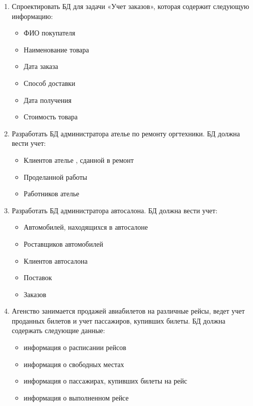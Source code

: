 \documentclass[a4paper]{article}
\begin{document}
\begin{enumerate}
   БД для задачи «Учет выполненных работ», которая содержит следующую информацию :
    \begin{itemize}
        \item ФИО работника
        \item Должность
        \item Наименование работы
        \item Срок выполнения
        \item Дата получения
        \item Отметка о выполнении
    \end{itemize}

  \item Спроектировать БД для задачи «Учет заказов», которая содержит следующую информацию:
    \begin{itemize}
        \item ФИО покупателя
        \item Наименование товара
        \item Дата заказа
        \item Способ доставки
        \item Дата получения
        \item Стоимость товара
    \end{itemize}

  \item Разработать БД администратора ателье по ремонту оргтехники. БД должна вести учет:
    \begin{itemize}
        \item Клиентов ателье
        , сданной в ремонт
        \item Проделанной работы
        \item Работников ателье
    \end{itemize}

  \item Разработать БД администратора автосалона. БД должна вести учет:
    \begin{itemize}
        \item Автомобилей, находящихся в автосалоне
        \item Роставщиков автомобилей
        \item Клиентов автосалона
        \item Поставок
        \item Заказов
    \end{itemize}

  \item Агенство занимается продажей авиабилетов на различные рейсы, ведет учет проданных билетов и учет пассажиров, купивших билеты. БД должна содержать следующие данные:
    \begin{itemize}
        \item информация о расписании рейсов
        \item информация о свободных местах
        \item информация о пассажирах, купивших билеты на рейс
        \item информация о выполненном рейсе
    \end{itemize}


\end{enumerate}
\end{document}
